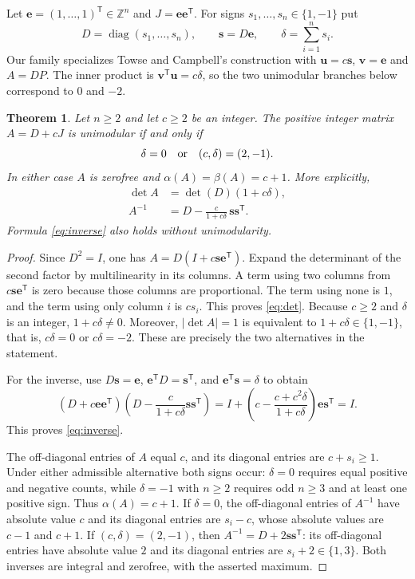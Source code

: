 \documentclass[11pt,a4paper]{article}
\newtheorem{theorem}{Theorem}
\DeclareMathOperator{\diag}{diag}
\begin{document}
Let $\mathbf e=(1,\ldots,1)^{\mathsf T}\in\mathbb Z^n$ and
$J=\mathbf e\mathbf e^{\mathsf T}$. For signs
$s_1,\ldots,s_n\in\{1,-1\}$ put
\[
 D=\diag(s_1,\ldots,s_n),\qquad
 \mathbf s=D\mathbf e,\qquad
 \delta=\sum_{i=1}^n s_i.
\]
Our family specializes Towse and Campbell's construction with
$\mathbf u=c\mathbf s$, $\mathbf v=\mathbf e$ and $A=DP$.
The inner product is $\mathbf v^{\mathsf T}\mathbf u=c\delta$,
so the two unimodular branches below correspond to $0$ and $-2$.

\begin{theorem}\label{thm:family}
Let $n\geq2$ and let $c\geq2$ be an integer. The positive integer
matrix $A=D+cJ$ is unimodular if and only if
\[
 \delta=0\quad\hbox{or}\quad(c,\delta)=(2,-1).
\]
In either case $A$ is zerofree and
$\alpha(A)=\beta(A)=c+1$. More explicitly,
\begin{align}
 \det A&=\det(D)(1+c\delta),\label{eq:det}\\
 A^{-1}&=D-\frac{c}{1+c\delta}\,
               \mathbf s\mathbf s^{\mathsf T}.\label{eq:inverse}
\end{align}
Formula \eqref{eq:inverse} also holds without unimodularity.
\end{theorem}

\begin{proof}
Since $D^2=I$, one has
$A=D(I+c\mathbf s\mathbf e^{\mathsf T})$.
Expand the determinant of the second factor by multilinearity in its
columns. A term using two columns from
$c\mathbf s\mathbf e^{\mathsf T}$ is zero because those columns
are proportional. The term using none is $1$, and the term using
only column $i$ is $cs_i$. This proves \eqref{eq:det}.
Because $c\geq2$ and $\delta$ is an integer, $1+c\delta\ne0$.
Moreover, $|\det A|=1$ is equivalent to
$1+c\delta\in\{1,-1\}$, that is, $c\delta=0$ or $c\delta=-2$.
These are precisely the two alternatives in the statement.

For the inverse, use
$D\mathbf s=\mathbf e$,
$\mathbf e^{\mathsf T}D=\mathbf s^{\mathsf T}$, and
$\mathbf e^{\mathsf T}\mathbf s=\delta$ to obtain
\[
 (D+c\mathbf e\mathbf e^{\mathsf T})
 \left(D-\frac{c}{1+c\delta}\mathbf s\mathbf s^{\mathsf T}\right)
 = I+\left(c-\frac{c+c^2\delta}{1+c\delta}\right)
               \mathbf e\mathbf s^{\mathsf T}=I.
\]
This proves \eqref{eq:inverse}.

The off-diagonal entries of $A$ equal $c$, and its diagonal entries
are $c+s_i\geq1$. Under either admissible alternative both signs
occur: $\delta=0$ requires equal positive and negative counts, while
$\delta=-1$ with $n\geq2$ requires odd $n\geq3$ and at least one
positive sign. Thus $\alpha(A)=c+1$.
If $\delta=0$, the off-diagonal entries of $A^{-1}$ have absolute
value $c$ and its diagonal entries are $s_i-c$, whose absolute
values are $c-1$ and $c+1$. If $(c,\delta)=(2,-1)$, then
$A^{-1}=D+2\mathbf s\mathbf s^{\mathsf T}$: its off-diagonal
entries have absolute value $2$ and its diagonal entries are
$s_i+2\in\{1,3\}$. Both inverses are integral and zerofree,
with the asserted maximum.
\end{proof}
\end{document}
